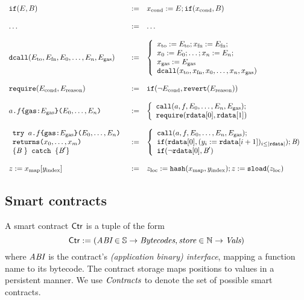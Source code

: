 \documentclass[12pt]{extarticle}
\begin{document}
$$ \begin{array} {lll}
\mathtt{if}(E,B) &:=& x_\textrm{cond} := E; \mathtt{if}(x_\textrm{cond},B)\\\\
\dots &:=& \dots\\\\
\mathtt{dcall}(E_\textrm{to},E_{\textrm{fn}},E_0,\dots,E_n,E_{\textrm{gas}}) &:=& \left\{
\begin{array}{l}
x_\textrm{to} := E_\textrm{to};x_\textrm{fn} := E_\textrm{fn}; \\
x_0 := E_0; \dots; x_n := E_n; \\
x_\textrm{gas} := E_\textrm{gas}\\
\mathtt{dcall}(x_\textrm{to},x_\textrm{fn},x_0,\dots,x_n,x_\textrm{gas})\\\end{array}\right.\\\\
\texttt{require}(E_\textrm{cond},E_\textrm{reason}) &:=& \mathtt{if}(\neg E_\textrm{cond},\mathtt{revert}(E_\textrm{reason}))\\\\
\texttt{$a$.$f$\{gas:$E_\textrm{gas}$\}($E_0,\dots,E_n$)} &:=& \left\{
\begin{array}{l}
    \mathtt{call}(a,f,E_0,\dots,E_n,E_\textrm{gas}); \\
    \texttt{require}(\mathtt{rdata}[0],\mathtt{rdata}[1])
\end{array}\right. \\\\
\begin{array}{l}
\texttt{try $a$.$f$\{gas:$E_\textrm{gas}$\}($E_0,\dots,E_n$)}\\
\texttt{returns($x_0,\dots,x_m$)}\\
\{\textit{B}\ \} \texttt{ catch } \{\textit{B}'\} \end{array} &:=& \left\{
    \begin{array}{l}
        \mathtt{call}(a,f,E_0,\dots,E_n,E_\textrm{gas}); \\
        \mathtt{if}(\mathtt{rdata}[0], (y_i:=\mathtt{rdata}[i+1])_{i\leq |\mathtt{rdata}|});\textit{B}) \\
        \mathtt{if}(\neg\mathtt{rdata}[0], \textit{B}')
    \end{array}\right. \\\\
z:=x_{\rm map}[y_{\rm index}] &:=& z_{\rm loc}:=\mathtt{hash}(x_{\rm map},y_{\rm index}); z:=\mathtt{sload}(z_{\rm loc})
\end{array}
$$

\subsection{Smart contracts}
A smart contract $\mathsf{Ctr}$ is a tuple of the form $$\mathsf{Ctr}:=(\textit{ABI}\in \mathbb{S}\to \textit{Bytecodes}, \textit{store}\in \mathbb{N}\to \textit{Vals})$$ where $\textit{ABI}$ is the contract's \emph{(application binary) interface}, mapping a function name to its bytecode. The contract storage maps positions to values in a persistent manner. We use $\textit{Contracts}$ to denote the set of possible smart contracts.
\end{document}
